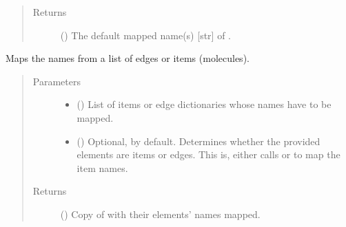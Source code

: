 \documentclass[letterpaper,10pt,english]{sphinxmanual}
\begin{document}
\begin{fulllineitems}
\begin{fulllineitems}
\begin{quote}
\begin{description}
\item[{Returns}] \leavevmode
() \textendash{} The default mapped name(s) {[}str{]} of .

\end{description}\end{quote}

\end{fulllineitems}


\begin{fulllineitems}
\label{\detokenize{main:pypath.main.PyPath.map_list}}
Maps the names from a list of edges or items (molecules).
\begin{quote}\begin{description}
\item[{Parameters}] \leavevmode\begin{itemize}
\item {} 
 () \textendash{} List of items or edge dictionaries whose names have to be
mapped.

\item {} 
 () \textendash{} Optional,  by default. Determines whether the
provided elements are items or edges. This is, either calls
{\hyperref[\detokenize{main:pypath.main.PyPath.map_edge}]{}} or
{\hyperref[\detokenize{main:pypath.main.PyPath.map_item}]{}} to map the item
names.

\end{itemize}

\item[{Returns}] \leavevmode
() \textendash{} Copy of  with their elements’ names mapped.

\end{description}\end{quote}

\end{fulllineitems}



\end{fulllineitems}
\end{document}
